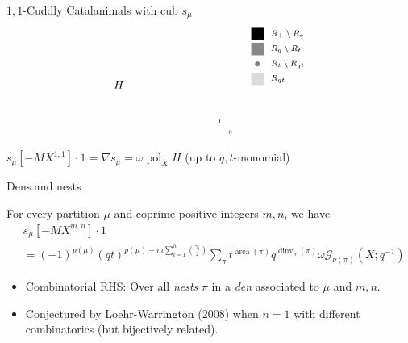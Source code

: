 \documentclass{beamer}
\DeclareMathOperator{\area}{area}
\DeclareMathOperator{\dinv}{dinv}
\newcommand{\Gcal}{\mathcal{G}}
\DeclareMathOperator{\pol}{pol}
\newcommand{\mymidgray}{black!47}  %
\newcounter{c}
\begin{document}
\begin{frame}{\(1,1\)-Cuddly Catalanimals with cub \(s_\mu\)}
\[\begin{array}{cr}
\begin{tikzpicture}[scale = .33]
\begin{scope}
\node (vv) at (19/2,-19/2) {\tiny $1 $};
\node at (21/2,-21/2) {\tiny $0 $};
\node at (0,-6) {\(H\)};
\end{scope}
\end{tikzpicture}&
\raisebox{16mm}{
\begin{tikzpicture}[scale = .39]
\begin{scope}
\draw[draw = none, fill = black!100] (2,-1) rectangle (3,-2);
\node[anchor = west] at (3,-1.5) {\scriptsize  \  $R_+ \setminus R_q$};
\end{scope}
\begin{scope}[yshift = -34*1]
\draw[draw = none, fill = \mymidgray] (2,-1) rectangle (3,-2);
\node[anchor = west] at (3,-1.5) {\scriptsize  \  $R_q \setminus R_t$};
\end{scope}
\begin{scope}[yshift = -34*2]
\draw[thin, black!0] (2,-1) -- (3,-1);
\draw[thin, black!0] (2,-1) -- (2,-2);
\draw[thin, black!0] (2,-2) -- (3,-2);
\draw[thin, black!0] (3,-2) -- (3,-1);
\draw[draw = none, fill = gray!100] (2+0.5, -1-0.5) circle (.2);
\node[anchor = west] at (3,-1.5) {\scriptsize  \  $R_t \setminus R_{qt}$};
\end{scope}
\begin{scope}[yshift = -34*3]
\draw[draw = none, fill = black!14] (2,-1) rectangle (3,-2);
\node[anchor = west] at (3,-1.5) {\scriptsize \  $R_{qt}$};
\end{scope}
\end{tikzpicture}}
    \end{array}
  \]
\(s_\mu[-MX^{1,1}] \cdot 1 = \nabla s_\mu = \omega\pol_X H\) (up to
\(q,t\)-monomial)
\end{frame}
\begin{frame}{Dens and nests}
  \begin{theorem}
    For every partition \(\mu\) and coprime positive integers \(m,n\),
    we have 
    \begin{align*}
      & s_\mu[-MX^{m,n}] \cdot 1 \\ & = (-1)^{p(\mu)}
      (qt)^{p(\mu)+m \sum_{i=1}^h \binom{\gamma_i}{2}}\sum_\pi t^{\area(\pi)}
      q^{\dinv_p(\pi)} \omega \Gcal_{\nu(\pi)}(X;q^{-1})
    \end{align*}
  \end{theorem}
  \begin{itemize}
  \item Combinatorial RHS: Over all \emph{nests} \(\pi\) in a
    \emph{den} associated to \(\mu\) and \(m,n\).\pause
  \item Conjectured by Loehr-Warrington (2008) when \(n=1\) with different
    combinatorics (but bijectively related).
  \end{itemize}
\end{frame}
\end{document}
